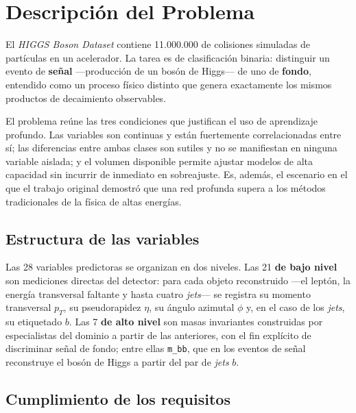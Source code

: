 \documentclass[12pt,a4paper]{article}
\begin{document}
\newpage
\thispagestyle{empty}
\tableofcontents
\newpage
\setcounter{page}{1}

\section{Descripción del Problema}

El \emph{HIGGS Boson Dataset} \citep{baldi2014, uci} contiene 11.000.000 de colisiones simuladas
de partículas en un acelerador. La tarea es de clasificación binaria: distinguir un evento de
\textbf{señal} ---producción de un bosón de Higgs--- de uno de \textbf{fondo}, entendido como un
proceso físico distinto que genera exactamente los mismos productos de decaimiento observables.

El problema reúne las tres condiciones que justifican el uso de aprendizaje profundo. Las
variables son continuas y están fuertemente correlacionadas entre sí; las diferencias entre ambas
clases son sutiles y no se manifiestan en ninguna variable aislada; y el volumen disponible
permite ajustar modelos de alta capacidad sin incurrir de inmediato en sobreajuste. Es, además, el
escenario en el que el trabajo original demostró que una red profunda supera a los métodos
tradicionales de la física de altas energías.

\subsection{Estructura de las variables}

Las 28 variables predictoras se organizan en dos niveles. Las 21 \textbf{de bajo nivel} son
mediciones directas del detector: para cada objeto reconstruido ---el leptón, la energía
transversal faltante y hasta cuatro \emph{jets}--- se registra su momento transversal $p_T$, su
pseudorapidez $\eta$, su ángulo azimutal $\phi$ y, en el caso de los \emph{jets}, su etiquetado
$b$. Las 7 \textbf{de alto nivel} son masas invariantes construidas por especialistas del dominio
a partir de las anteriores, con el fin explícito de discriminar señal de fondo; entre ellas
\texttt{m\_bb}, que en los eventos de señal reconstruye el bosón de Higgs a partir del par de
\emph{jets} $b$.

\subsection{Cumplimiento de los requisitos}
\end{document}
